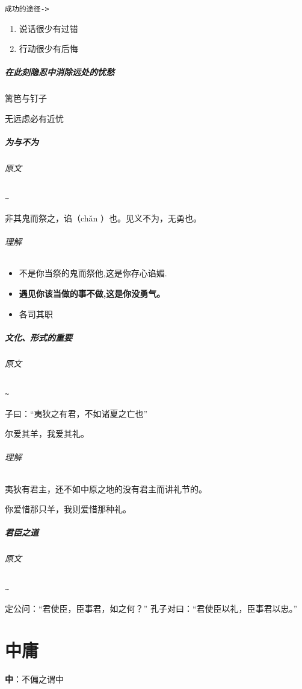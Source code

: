 \documentclass[UTF8,a4paper,8pt]{ctexbook}
\begin{document}
				
			\verb|成功的途径->|
				\begin{enumerate}[itemindent = 2em]
					\item 说话很少有过错
					\item 行动很少有后悔								
				\end{enumerate}

			
		\paragraph{在此刻隐忍中消除远处的忧愁} 篱笆与钉子
		
			无远虑必有近忧
		
		\paragraph{为与不为}
			\subparagraph{原文}\verb|~|
			
			 	非其鬼而祭之，谄（chǎn ）也。见义不为，无勇也。
			
			\subparagraph{理解}
				\begin{itemize}[itemindent=1em]
					\item 不是你当祭的鬼而祭他,这是你存心谄媚.
					\item \textbf{遇见你该当做的事不做,这是你没勇气。}
					\item 各司其职
				\end{itemize}
		
		\paragraph{文化、形式的重要}
			\subparagraph{原文}\verb|~|
				
				子曰：“夷狄之有君，不如诸夏之亡也”
			
				尔爱其羊，我爱其礼。
			\subparagraph{理解}
				夷狄有君主，还不如中原之地的没有君主而讲礼节的。
				
				你爱惜那只羊，我则爱惜那种礼。
		
		\paragraph{君臣之道}
			\subparagraph{原文}\verb|~|
			
				定公问：“君使臣，臣事君，如之何？” 孔子对曰：“君使臣以礼，臣事君以忠。”
			
						
\chapter{中庸}
	\textbf{中}：不偏之谓中
	
\end{document}
